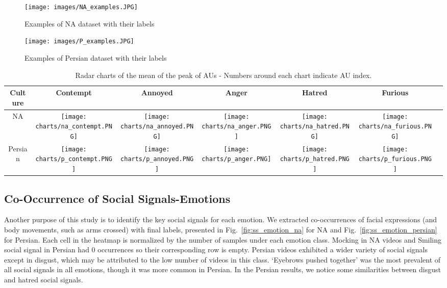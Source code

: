\documentclass[letterpaper, 10 pt, conference]{ieeeconf}  \usepackage{FG2021}
\begin{document}
\begin{figure*}[t]
\centering
\texttt{[image: images/NA\_examples.JPG]}
\caption{Examples of NA dataset with their labels}
\label{fig:na_examples}
\end{figure*}


\begin{figure*}[t]
\centering
\texttt{[image: images/P\_examples.JPG]}
\caption{Examples of Persian dataset with their labels}
\label{fig:p_examples}
\end{figure*}

\begin{table*}[t]
\caption{Radar charts of the mean of the peak of AUs - Numbers around each chart indicate AU index.}
  \centering
  \begin{tabular}{| c | c | c | c | c | c | c |}
  \hline
     Culture & Contempt & Annoyed & Anger & Hatred & Furious \\ [1ex] \hline
     NA & \texttt{[image: charts/na\_contempt.PNG]}&\texttt{[image: charts/na\_annoyed.PNG]} &
     \texttt{[image: charts/na\_anger.PNG]} &
     \texttt{[image: charts/na\_hatred.PNG]} &
     \texttt{[image: charts/na\_furious.PNG]} \\ [1ex] \hline
     Persian & \texttt{[image: charts/p\_contempt.PNG]}&\texttt{[image: charts/p\_annoyed.PNG]} &
     \texttt{[image: charts/p\_anger.PNG]} &
     \texttt{[image: charts/p\_hatred.PNG]} &
     \texttt{[image: charts/p\_furious.PNG]} \\ [1ex] \hline
    \end{tabular}
    \label{tab:radar}
\end{table*}

\subsection{Co-Occurrence of Social Signals-Emotions}
Another purpose of this study is to identify the key social signals for each emotion. We extracted co-occurrences of facial expressions (and body movements, such as arms crossed) with final labels, presented in Fig.~\ref{fig:ss_emotion_na} for NA and Fig.~\ref{fig:ss_emotion_persian} for Persian. Each cell in the heatmap is normalized by the number of samples under each emotion class. Mocking in NA videos and Smiling social signal in Persian had 0 occurrences so their corresponding row is empty. Persian videos exhibited a wider variety of social signals except in disgust, which may be attributed to the low number of videos in this class. `Eyebrows pushed together' was the most prevalent of all social signals in all emotions, though it was more common in Persian. In the Persian results, we notice some similarities between disgust and hatred social signals.
\end{document}
